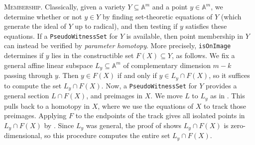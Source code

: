 \documentclass[letter]{amsart}
\theoremstyle{definition}
\begin{document}
\noindent \textsc{Membership.} 
Classically, given a variety $Y \subseteq {\mathbb{A}}^m$ and a point $y \in {\mathbb{A}}^m$, we determine whether or not $y \in Y$
by finding set-theoretic equations of $Y$ (which generate the ideal of $Y$ up to radical), 
and then testing if $y$ satisfies these equations.
If a \texttt{PseudoWitnessSet} for $Y$ is available, then point membership in $Y$ can instead be verified by \textit{parameter homotopy}.  More precisely, \texttt{isOnImage} determines if $y$ lies in the constructible set $F(X) \subseteq Y$, as follows.  We fix a general affine linear subspace $L_y \subseteq {\mathbb{A}}^m$ of complementary dimension $m-k$ passing through $y$.   Then $y \in F(X)$ if and only if $y \in L_y \cap F(X)$, so it suffices to compute the set $L_y \cap F(X)$. 
Now, a \texttt{PseudoWitnessSet} for $Y$ provides
a general section $L \cap F(X)$, and preimages in $X$.  We move $L$ to $L_y$ as in \cite[Theorem 7.1.6]{SW}.  This pulls back to a homotopy in $X$, where we use the equations of $X$ to track those preimages.  Applying $F$ to the endpoints of the track gives all isolated points in $L_y \cap F(X)$ by \cite[Theorem 7.1.6]{SW}.  Since $L_y$ was general, the proof of \cite[Corollary 10.5]{Eis} shows
$L_y \cap F(X)$ is zero-dimensional, so this procedure computes the entire set $L_y \cap F(X)$.
\end{document}
